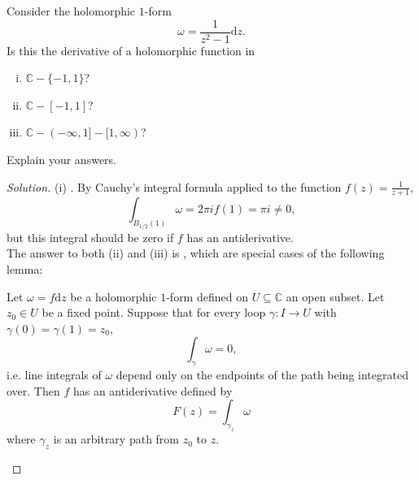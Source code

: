 \documentclass[10pt]{article}
\newcommand{\dd}{\mathrm{d}}
\providecommand{\CC}{\mathbb C}
\providecommand{\ii}{\item}
\newenvironment{soln}{\begin{proof}[Solution]}{\end{proof}}
\begin{document}
\pagebreak
\begin{problem}
    Consider the holomorphic $1$-form
    \begin{equation*}
	\omega = \frac 1{z^2 - 1}\dd z.
    \end{equation*}
    Is this the derivative of a holomorphic function in
    \begin{enumerate}[(i)]
	\ii $\CC - \{-1,1\}$?
	\ii $\CC - [-1,1]$?
	\ii $\CC - (-\infty,1]-[1,\infty)$?
    \end{enumerate}
    Explain your answers.
\end{problem}

\begin{soln}
    (i) . By Cauchy's integral formula
    applied to the function $f(z) = \frac 1{z+1}$,
    \begin{equation*}
	\int_{B_{1/2}(1)} \omega = 2\pi if(1) = \pi i\ne 0,
    \end{equation*}
    but this integral should be zero if $f$ has an antiderivative.
    \\

    The answer to both (ii) and (iii) is ,
    which are special cases of the following lemma:
    \begin{lemma}
        Let $\omega = f\dd z$ be a holomorphic $1$-form defined on
	$U\subseteq\CC$ an open subset. Let $z_0\in U$ be a fixed point.
	Suppose that for every loop $\gamma\colon I\to U$
	with $\gamma(0) = \gamma(1) = z_0$,
	\begin{equation*}
	    \int_\gamma\omega = 0,
	\end{equation*}
	i.e. line integrals of $\omega$ depend only on the endpoints
	of the path being integrated over.
	Then $f$ has an antiderivative defined by
	\begin{equation*}
	    F(z) = \int_{\gamma_z}\omega
	\end{equation*}
	where $\gamma_z$ is an arbitrary path from $z_0$ to $z$.
    \end{lemma}


\end{soln}
\end{document}
